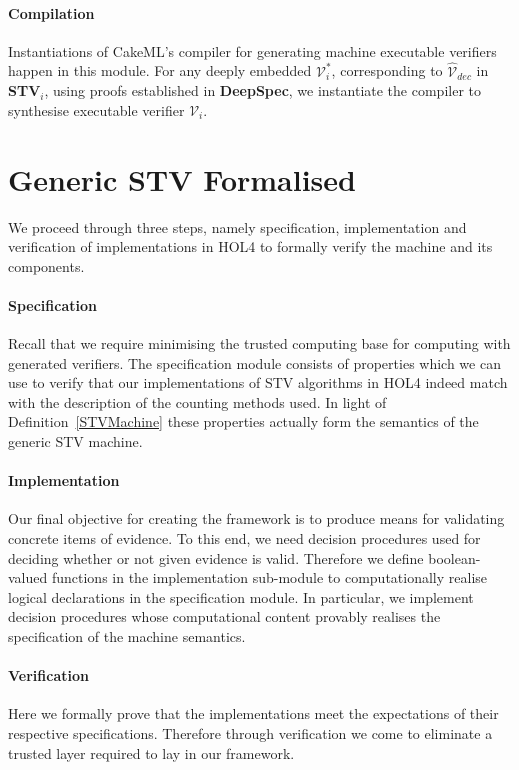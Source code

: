 \documentclass[10pt,conference]{IEEEtran}
\begin{document}
\paragraph*{\textbf{Compilation}} 
Instantiations of CakeML's  compiler for generating machine executable verifiers happen in this module. For any deeply embedded $\mathcal{V}^{*}_{i}$, corresponding to $\hat{\mathcal{V}}_{dec}$ in \textbf{STV}$_{i}$, using proofs  established in \textbf{DeepSpec}, we instantiate the compiler to synthesise executable  verifier $\mathcal{V}_{i}$.  
\section{Generic STV Formalised}\label{sec:GenCertVer}
We proceed through three steps, namely specification, implementation and verification of implementations in HOL4 to formally verify the machine and its components.
\paragraph*{Specification}  
Recall that we require minimising the trusted computing base  for computing with generated verifiers. The specification module consists of properties which we can use to verify that our implementations of  STV algorithms in HOL4 indeed match with the description of the counting methods used.  
 In light of Definition~\ref{STVMachine} these properties   actually form the semantics of the generic STV machine.   
\paragraph*{Implementation} Our final objective for creating the
framework is to produce means for validating concrete items of evidence. To this end, we need decision procedures used for deciding whether or not  given evidence is valid. Therefore we define boolean-valued functions in the implementation sub-module to computationally realise logical declarations in the specification module. In particular, we implement decision procedures whose computational content  provably realises the specification of the machine semantics.  
\paragraph*{Verification} Here we formally prove that the implementations meet the expectations of their respective specifications. Therefore through verification we come to eliminate a trusted layer  required to lay in our framework.  
\end{document}
